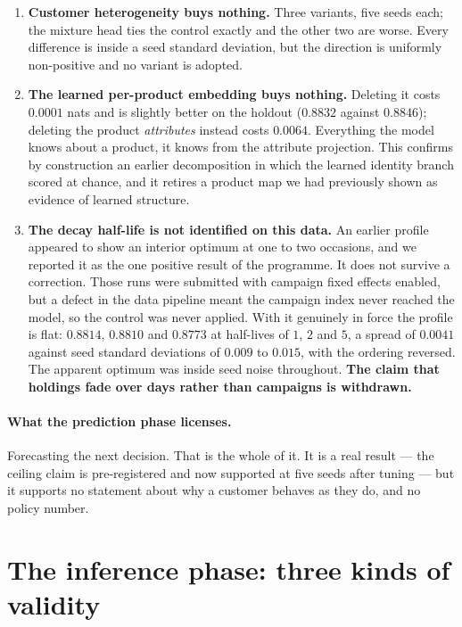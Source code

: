 \documentclass[11pt]{article}
\begin{document}
\begin{enumerate}
\item \textbf{Customer heterogeneity buys nothing.} Three variants, five seeds
each; the mixture head ties the control exactly and the other two are worse.
Every difference is inside a seed standard deviation, but the direction is
uniformly non-positive and no variant is adopted.

\item \textbf{The learned per-product embedding buys nothing.} Deleting it
costs $0.0001$ nats and is slightly better on the holdout ($0.8832$ against
$0.8846$); deleting the product \emph{attributes} instead costs $0.0064$.
Everything the model knows about a product, it knows from the attribute
projection. This confirms by construction an earlier decomposition in which the
learned identity branch scored at chance, and it retires a product map we had
previously shown as evidence of learned structure.

\item \textbf{The decay half-life is not identified on this data.} An earlier
profile appeared to show an interior optimum at one to two occasions, and we
reported it as the one positive result of the programme. It does not survive a
correction. Those runs were submitted with campaign fixed effects enabled, but a
defect in the data pipeline meant the campaign index never reached the model, so
the control was never applied. With it genuinely in force the profile is flat:
$0.8814$, $0.8810$ and $0.8773$ at half-lives of $1$, $2$ and $5$, a spread of
$0.0041$ against seed standard deviations of $0.009$ to $0.015$, with the
ordering reversed. The apparent optimum was inside seed noise throughout.
\textbf{The claim that holdings fade over days rather than campaigns is
withdrawn.}
\end{enumerate}

\paragraph{What the prediction phase licenses.} Forecasting the next decision.
That is the whole of it. It is a real result --- the ceiling claim is
pre-registered and now supported at five seeds after tuning --- but it supports
no statement about why a customer behaves as they do, and no policy number.

\section{The inference phase: three kinds of validity}
\end{document}
